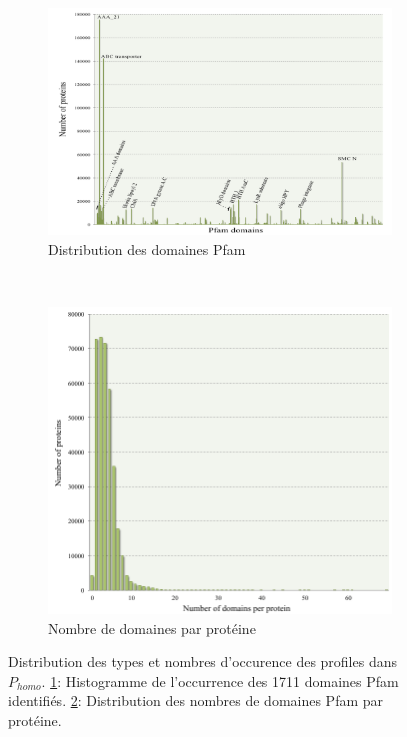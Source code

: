 \begin{figure}
	\begin{center}
	\begin{subfigure}{0.8\linewidth}
		\includegraphics[width=\textwidth]{./img/domain_occurence.png}
		\caption{Distribution des domaines Pfam}\label{figdomain1}
	\end{subfigure}
	\\
	\begin{subfigure}{0.8\linewidth}
		\includegraphics[width=\textwidth]{./img/domain_per_prot.png}
		\caption{Nombre de domaines par protéine}\label{figdomain2}
	\end{subfigure}
	\caption[Distribution des types et nombres d'occurence des profiles dans $P_{homo}$]{Distribution des types et nombres d'occurence des profiles dans $P_{homo}$. \ref{figdomain1}: Histogramme de l’occurrence des 1711 domaines Pfam identifiés. \ref{figdomain2}: Distribution des nombres de domaines Pfam par protéine.}
	\label{figdomain}
	\end{center}
\end{figure}




